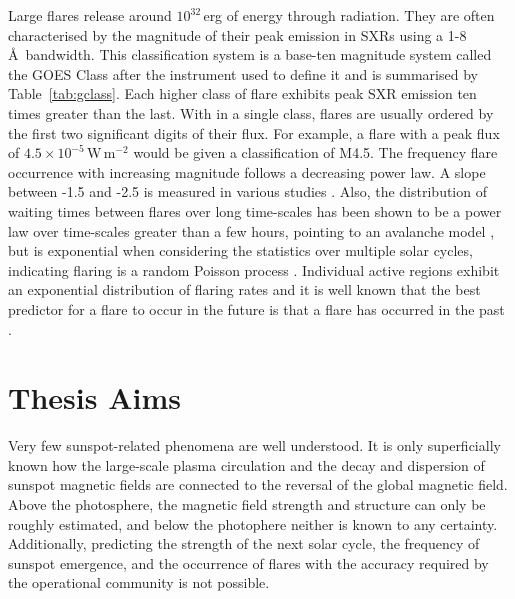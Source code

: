 Large flares release around $10^{32}$\,erg of energy through radiation. They are often characterised by the magnitude of their peak emission in \glspl{SXR} using a 1-8\,\AA\ bandwidth. This classification system is a base-ten magnitude system called the GOES Class after the instrument used to define it and is summarised by Table~\ref{tab:gclass}. Each higher class of flare exhibits peak SXR emission ten times greater than the last. With in a single class, flares are usually ordered by the first two significant digits of their flux. For example, a flare with a peak flux of $4.5\times10^{-5}$\,W\,m$^{-2}$ would be given a classification of M4.5. The frequency flare occurrence with increasing magnitude follows a decreasing power law. A slope between -1.5 and -2.5 is measured in various studies \citep[see Figure~\ref{fig:flarephase};][]{Aschwanden:2011}. 
Also, the distribution of waiting times between flares over long time-scales has been shown to be a power law over time-scales greater than a few hours, pointing to an avalanche model \citep{Lu:1993}, but is exponential when considering the statistics over multiple solar cycles, indicating flaring is a random Poisson process \citep{Wheatland:2000}. Individual active regions exhibit an exponential distribution of flaring rates \citep{Wheatland:2001} and it is well known that the best predictor for a flare to occur in the future is that a flare has occurred in the past \citep{Wheatland:2005}.

\section{Thesis Aims}\label{intro:aims}

Very few sunspot-related phenomena are well understood. It is only superficially known how the large-scale plasma circulation and the decay and dispersion of sunspot magnetic fields are connected to the reversal of the global magnetic field. Above the photosphere, the magnetic field strength and structure can only be roughly estimated, and below the photophere neither is known to any certainty. Additionally, predicting the strength of the next solar cycle, the frequency of sunspot emergence, and the occurrence of flares with the accuracy required by the operational community is not possible. 

